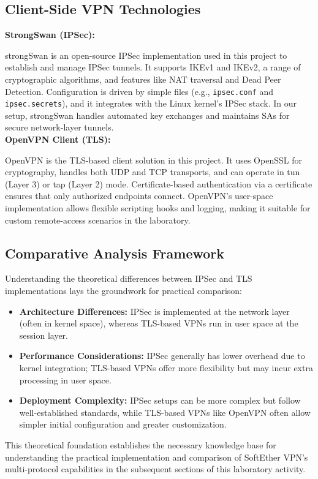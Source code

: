\subsection{Client-Side VPN Technologies}

\textbf{StrongSwan (IPSec):}

\noindent
strongSwan is an open-source IPSec implementation used in this project to establish and manage IPSec tunnels. It supports IKEv1 and IKEv2, a range of cryptographic algorithms, and features like NAT traversal and Dead Peer Detection. Configuration is driven by simple files (e.g., \texttt{ipsec.conf} and \texttt{ipsec.secrets}), and it integrates with the Linux kernel’s IPSec stack. In our setup, strongSwan handles automated key exchanges and maintains SAs for secure network-layer tunnels.\\

\noindent
\textbf{OpenVPN Client (TLS):}

\noindent
OpenVPN is the TLS-based client solution in this project. It uses OpenSSL for cryptography, handles both UDP and TCP transports, and can operate in tun (Layer 3) or tap (Layer 2) mode. Certificate-based authentication via a certificate ensures that only authorized endpoints connect. OpenVPN’s user-space implementation allows flexible scripting hooks and logging, making it suitable for custom remote-access scenarios in the laboratory.

\subsection{Comparative Analysis Framework}

Understanding the theoretical differences between IPSec and TLS implementations lays the groundwork for practical comparison:

\begin{itemize}
    \item \textbf{Architecture Differences:} IPSec is implemented at the network layer (often in kernel space), whereas TLS-based VPNs run in user space at the session layer.
    
    \item \textbf{Performance Considerations:} IPSec generally has lower overhead due to kernel integration; TLS-based VPNs offer more flexibility but may incur extra processing in user space.
    
    \item \textbf{Deployment Complexity:} IPSec setups can be more complex but follow well-established standards, while TLS-based VPNs like OpenVPN often allow simpler initial configuration and greater customization.
    
\end{itemize}


This theoretical foundation establishes the necessary knowledge base for understanding the practical implementation and comparison of SoftEther VPN's multi-protocol capabilities in the subsequent sections of this laboratory activity.
